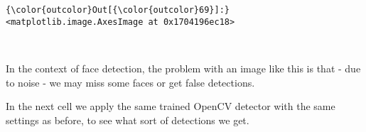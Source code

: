 \documentclass[11pt]{article}
\begin{document}
\begin{Verbatim}[commandchars=\\\{\}]
{\color{outcolor}Out[{\color{outcolor}69}]:} <matplotlib.image.AxesImage at 0x1704196ec18>
\end{Verbatim}
            
    \begin{center}
    \end{center}
    { \hspace*{\fill} \\}
    
    In the context of face detection, the problem with an image like this is
that - due to noise - we may miss some faces or get false detections.

In the next cell we apply the same trained OpenCV detector with the same
settings as before, to see what sort of detections we get.
\end{document}
